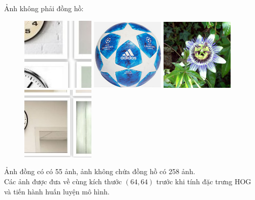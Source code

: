 \documentclass[../report.tex]{subfiles}
\begin{document}
\noindent Ảnh không phải đồng hồ: 
\begin{figure}[H]
\centering
\includegraphics[width=3.5cm]{figures/nonclock-1.png}
\includegraphics[width=3.5cm]{figures/nonclock-2.png}
\includegraphics[width=3.5cm]{figures/nonclock-3.png}
\includegraphics[width=3.5cm]{figures/nonclock-4.png}
\end{figure}
\noindent Ảnh đồng có có 55 ảnh, 
ảnh không chứa đồng hồ có 258 ảnh. \\[3mm]
Các ảnh được đưa về cùng kích thước $(64, 64)$ trước 
khi tính đặc trưng HOG và tiến hành huấn luyện mô hình.
\end{document}
